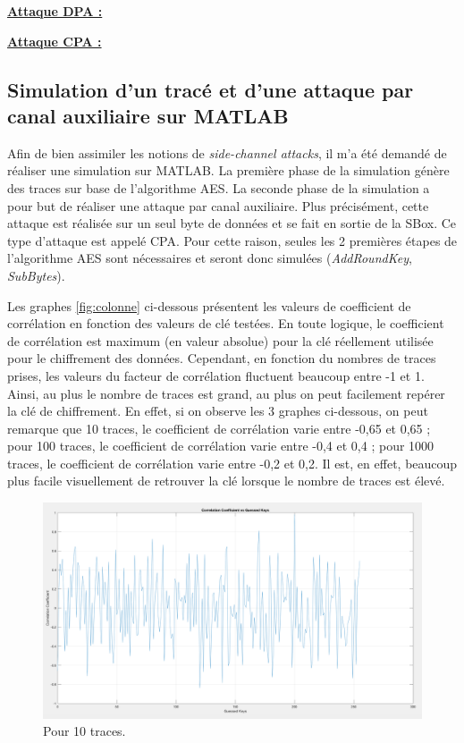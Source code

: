 \documentclass[10pt, oneside, a4paper]{article}
\begin{document}
\underline{\textbf{Attaque DPA :}}

\underline{\textbf{Attaque CPA :}}

\newpage

\subsection{Simulation d'un tracé et d'une attaque par canal auxiliaire sur MATLAB}

Afin de bien assimiler les notions de \textit{side-channel attacks}, il m'a été demandé de réaliser une simulation sur MATLAB. La première phase de la simulation génère des traces sur base de l'algorithme AES. La seconde phase de la simulation a pour but de réaliser une attaque par canal auxiliaire. Plus précisément, cette attaque est réalisée sur un seul byte de données et se fait en sortie de la SBox. Ce type d'attaque est appelé CPA. Pour cette raison, seules les 2 premières étapes de l'algorithme AES sont nécessaires et seront donc simulées (\textit{AddRoundKey}, \textit{SubBytes}).

Les graphes \ref{fig:colonne} ci-dessous présentent les valeurs de coefficient de corrélation en fonction des valeurs de clé testées. En toute logique, le coefficient de corrélation est maximum (en valeur absolue) pour la clé réellement utilisée pour le chiffrement des données. Cependant, en fonction du nombres de traces prises, les valeurs du facteur de corrélation fluctuent beaucoup entre -1 et 1. Ainsi, au plus le nombre de traces est grand, au plus on peut facilement repérer la clé de chiffrement. En effet, si on observe les 3 graphes ci-dessous, on peut remarque que 10 traces, le coefficient de corrélation varie entre -0,65 et 0,65 ; pour 100 traces, le coefficient de corrélation varie entre -0,4 et 0,4 ; pour 1000 traces, le coefficient de corrélation varie entre -0,2 et 0,2.
Il est, en effet, beaucoup plus facile visuellement de retrouver la clé lorsque le nombre de traces est élevé.


\begin{figure}[htbp]
    \centering
    \includegraphics[width=1.05\textwidth]{image/10}    \caption{Pour 10 traces.}    \label{fig:10}
\end{figure}
\end{document}
